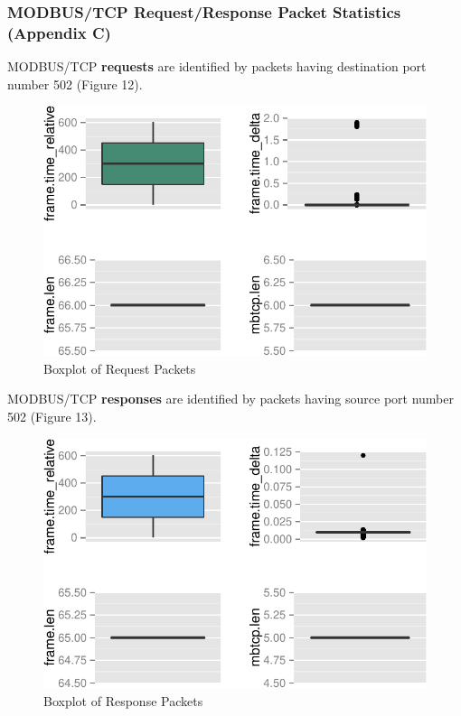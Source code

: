 \documentclass[11pt,a4paper]{article}
\begin{document}
\newpage

\subsubsection{MODBUS/TCP Request/Response Packet Statistics (Appendix
C)}\label{modbustcp-requestresponse-packet-statistics-appendix-c}

MODBUS/TCP \textbf{requests} are identified by packets having
destination port number 502 (Figure 12).

\begin{figure}[h]

{\centering \includegraphics{thesis_files/figure-latex/unnamed-chunk-22-1} 

}

\caption{Boxplot of Request Packets}\label{fig:unnamed-chunk-22}
\end{figure}

MODBUS/TCP \textbf{responses} are identified by packets having source
port number 502 (Figure 13).

\begin{figure}[h]

{\centering \includegraphics{thesis_files/figure-latex/unnamed-chunk-23-1} 

}

\caption{Boxplot of Response Packets}\label{fig:unnamed-chunk-23}
\end{figure}
\end{document}
